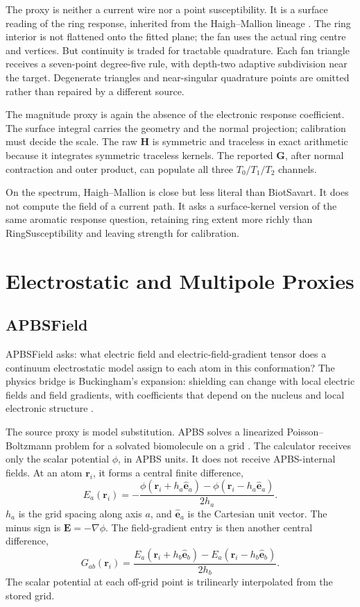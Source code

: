 \documentclass[11pt]{article}
\begin{document}
The proxy is neither a current wire nor a point susceptibility. It is a surface
reading of the ring response, inherited from the Haigh--Mallion lineage
\cite{haigh1979}. The ring interior is not flattened onto the fitted plane; the
fan uses the actual ring centre and vertices. But continuity is traded for
tractable quadrature. Each fan triangle receives a seven-point degree-five
rule, with depth-two adaptive subdivision near the target. Degenerate triangles
and near-singular quadrature points are omitted rather than repaired by a
different source.

The magnitude proxy is again the absence of the electronic response
coefficient. The surface integral carries the geometry and the normal
projection; calibration must decide the scale. The raw \(\bm H\) is symmetric
and traceless in exact arithmetic because it integrates symmetric traceless
kernels. The reported \(\bm G\), after normal contraction and outer product,
can populate all three \(T_0/T_1/T_2\) channels.

On the spectrum, Haigh--Mallion is close but less literal than BiotSavart. It
does not compute the field of a current path. It asks a surface-kernel version
of the same aromatic response question, retaining ring extent more richly than
RingSusceptibility and leaving strength for calibration.

\section{Electrostatic and Multipole Proxies}

\subsection{APBSField}

APBSField asks: what electric field and electric-field-gradient tensor does a
continuum electrostatic model assign to each atom in this conformation? The
physics bridge is Buckingham's expansion: shielding can change with local
electric fields and field gradients, with coefficients that depend on the
nucleus and local electronic structure \cite{buckingham1960,hass2008,kukic2013}.

The source proxy is model substitution. APBS solves a linearized
Poisson--Boltzmann problem for a solvated biomolecule on a grid
\cite{baker2001}. The calculator receives only the scalar potential
\(\phi\), in APBS units. It does not receive APBS-internal fields. At an atom
\(\bm r_i\), it forms a central finite difference,
\[
  E_a(\bm r_i)
  =
  -\frac{\phi(\bm r_i+h_a\hat{\bm e}_a)
          -\phi(\bm r_i-h_a\hat{\bm e}_a)}
         {2h_a}.
\]
\(h_a\) is the grid spacing along axis \(a\), and
\(\hat{\bm e}_a\) is the Cartesian unit vector. The minus sign is
\(\bm E=-\nabla\phi\). The field-gradient entry is then another central
difference,
\[
  G_{ab}(\bm r_i)
  =
  \frac{E_a(\bm r_i+h_b\hat{\bm e}_b)
        -E_a(\bm r_i-h_b\hat{\bm e}_b)}
       {2h_b}.
\]
The scalar potential at each off-grid point is trilinearly interpolated from
the stored grid.
\end{document}

